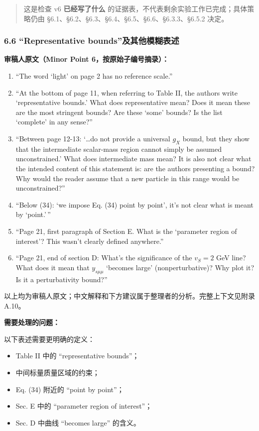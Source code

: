 \documentclass[
  chinese,
  UTF8]{ctexart}
\providecommand{\tightlist}{%
  \setlength{\itemsep}{0pt}\setlength{\parskip}{0pt}}
\begin{document}
\begin{quote}
这是检查 v6 \textbf{已经写了什么}
的证据表，不代表剩余实验工作已完成；具体策略仍由
§6.1、§6.2、§6.3、§6.4、§6.5、§6.6、§6.3.3、§6.5.2 决定。
\end{quote}

\subsubsection{6.6 ``Representative
bounds''及其他模糊表述}\label{representative-boundsux53caux5176ux4ed6ux6a21ux7ccaux8868ux8ff0}

\textbf{审稿人原文（Minor Point 6，按原始子编号摘录）：}

\begin{enumerate}
\def\labelenumi{\arabic{enumi}.}
\tightlist
\item
  ``The word `light' on page 2 has no reference scale.''
\item
  ``At the bottom of page 11, when referring to Table II, the authors
  write `representative bounds.' What does representative mean? Does it
  mean these are the most stringent bounds? Are these `some' bounds? Is
  the list `complete' in any sense?''
\item
  ``Between page 12-13: `\ldots do not provide a universal \(g_X\)
  bound, but they show that the intermediate scalar-mass region cannot
  simply be assumed unconstrained.' What does intermediate mass mean? It
  is also not clear what the intended content of this statement is: are
  the authors presenting a bound? Why would the reader assume that a new
  particle in this range would be unconstrained?''
\item
  ``Below (34): `we impose Eq. (34) point by point', it's not clear what
  is meant by `point.'\,''
\item
  ``Page 21, first paragraph of Section E. What is the `parameter region
  of interest'? This wasn't clearly defined anywhere.''
\item
  ``Page 21, end of section D: What's the significance of the \(v_S=2\)
  GeV line? What does it mean that \(y_{s\mu\mu}\) `becomes large'
  (nonperturbative)? Why plot it? Is it a perturbativity bound?''
\end{enumerate}

以上均为审稿人原文；中文解释和下方建议属于整理者的分析。完整上下文见附录
A.10。

\textbf{需要处理的问题：}

以下表述需要更明确的定义：

\begin{itemize}
\tightlist
\item
  Table II 中的 ``representative bounds''；
\item
  中间标量质量区域的约束；
\item
  Eq. (34) 附近的 ``point by point''；
\item
  Sec. E 中的 ``parameter region of interest''；
\item
  Sec. D 中曲线 ``becomes large'' 的含义。
\end{itemize}
\end{document}
